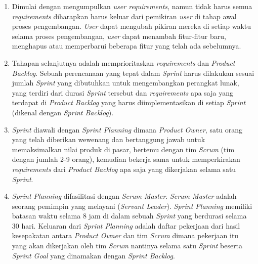 \begin {enumerate}[1.]
\item Dimulai dengan mengumpulkan \textit{user requirements}, namun tidak harus semua \textit{requirements} diharapkan harus keluar dari pemikiran \textit{user} di tahap awal proses pengembangan. \textit{User} dapat mengubah pikiran mereka di setiap waktu selama proses pengembangan, \textit{user} dapat menambah fitur-fitur baru, menghapus atau memperbarui beberapa fitur yang telah ada sebelumnya. 
\item Tahapan selanjutnya adalah memprioritaskan \textit{requirements} dan \textit{Product Backlog}. Sebuah perencanaan yang tepat dalam \textit{Sprint} harus dilakukan sesuai jumlah \textit{Sprint} yang dibutuhkan untuk mengembangkan perangkat lunak, yang terdiri dari durasi \textit{Sprint} tersebut dan \textit{requirements} apa saja yang terdapat di \textit{Product Backlog} yang harus diimplementasikan di setiap \textit{Sprint} (dikenal dengan \textit{Sprint Backlog}). 
\item \textit{Sprint} diawali dengan \textit{Sprint Planning} dimana \textit{Product Owner}, satu orang yang telah diberikan wewenang dan bertanggung jawab untuk memaksimalkan nilai produk di pasar, bertemu dengan tim \textit{Scrum} (tim dengan jumlah 2-9 orang), kemudian bekerja sama untuk memperkirakan \textit{requirements} dari \textit{Product Backlog} apa saja yang dikerjakan selama satu \textit{Sprint}.
\item \textit{Sprint Planning} difasilitasi dengan \textit{Scrum Master}. \textit{Scrum Master} adalah seorang pemimpin yang melayani (\textit{Servant Leader}). \textit{Sprint Planning} memiliki batasan waktu selama 8 jam di dalam sebuah \textit{Sprint} yang berdurasi selama 30 hari. Keluaran dari \textit{Sprint Planning} adalah daftar pekerjaan dari hasil kesepakatan antara \textit{Product Owner} dan tim \textit{Scrum} dimana pekerjaan itu yang akan dikerjakan oleh tim \textit{Scrum} nantinya selama satu \textit{Sprint} beserta \textit{Sprint Goal} yang dinamakan dengan \textit{Sprint Backlog}. 

\end{enumerate}
